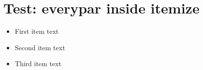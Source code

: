 \documentclass[11pt,a4paper]{article}
\begin{document}
\section{Test: everypar inside itemize}

\lipsum[1][1-2]

\begin{itemize}
  \item First item text
  \item Second item text
  \item Third item text
\end{itemize}

\lipsum[1][1-2]
\end{document}
